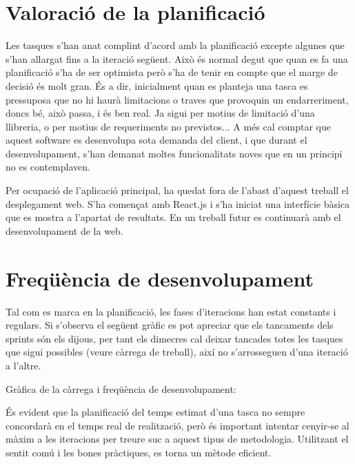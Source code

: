 \documentclass[letterpaper,11pt,catalan]{sphinxmanual}
\begin{document}
\section{Valoració de la planificació}
\label{\detokenize{index:valoracio-de-la-planificacio}}
Les tasques s'han anat complint d'acord amb la planificació excepte algunes que s'han
allargat fins a la iteració següent. Això és normal degut que quan es fa una planificació
s'ha de ser optimista però s'ha de tenir en compte que el marge de decisió és molt gran.
És a dir, inicialment quan es planteja una tasca es pressuposa que no hi haurà limitacions o
traves que provoquin un endarreriment, doncs bé, això passa, i és ben real. Ja sigui per motius
de limitació d'una llibreria, o per motius de requeriments no previstos... A més cal comptar
que aquest software es desenvolupa sota demanda del client, i que durant el desenvolupament, s'han demanat moltes
funcionalitats noves que en un principi no es contemplaven.

Per ocupació de l'aplicació principal, ha quedat fora de l'abast d'aquest treball el desplegament web. S'ha començat amb React.js i
s'ha iniciat una interfície bàsica que es mostra a l'apartat de resultats. En un treball futur
es continuarà amb el desenvolupament de la web.


\section{Freqüència de desenvolupament}
\label{\detokenize{index:frequencia-de-desenvolupament}}
Tal com es marca en la planificació, les fases d'iteracions han estat constants
i regulars.
Si s'observa el següent gràfic es pot apreciar que els tancaments dels
sprints són els dijous, per tant els dimecres cal deixar tancades totes les tasques
que sigui possibles (veure càrrega de treball), així no s'arrosseguen d'una iteració a l'altre.

Gràfica de la càrrega i freqüència de desenvolupament:



És evident que la planificació del temps estimat d'una tasca no sempre concordarà en el temps real
de realització, però és important intentar cenyir-se al màxim a les iteracions per
treure suc a aquest tipus de metodologia. Utilitzant el sentit comú i les bones pràctiques,
es torna un mètode eficient.
\end{document}
